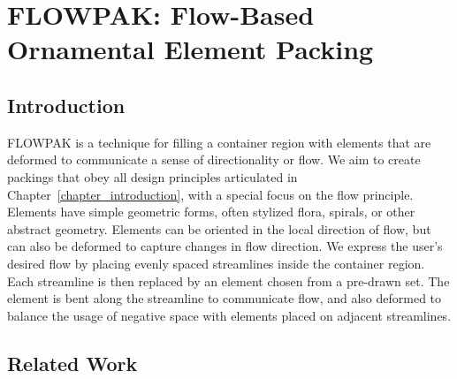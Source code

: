 \chapter
{FLOWPAK: Flow-Based Ornamental Element Packing}
\label{chapter_flowpak}








\section{Introduction}
\label{flowpak_introduction}





\newtext
{
FLOWPAK is a technique for filling a container 
region with elements that are deformed 
to communicate a sense of directionality or flow.
We aim to create packings that obey all design principles articulated in Chapter~\ref{chapter_introduction},
with a special focus on the flow principle.
Elements have simple geometric forms, often stylized flora, spirals, or other abstract geometry.}
Elements can be oriented in the local direction 
of flow, but can also be deformed to capture changes in flow direction.
We express the user's desired flow by placing evenly spaced streamlines
inside the container region.  Each streamline is then replaced by an
element chosen from a pre-drawn set.  The element is bent along the streamline
to communicate flow, and also deformed to balance the usage of negative space
with elements placed on adjacent streamlines.  




\section{Related Work}
\label{flowpak_previous_work}

